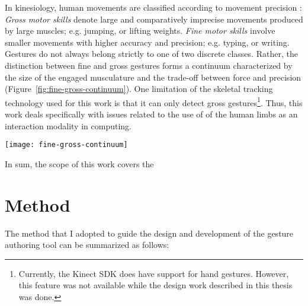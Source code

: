 In kinesiology, human movements are classified according to movement precision \parencite{Haibach:2011}: \emph{Gross motor skills} denote large and comparatively imprecise movements produced by large muscles; e.g. jumping, or lifting weights. \emph{Fine motor skills} involve smaller movements with higher accuracy and precision; e.g. typing, or writing. Gestures do not always belong strictly to one of two discrete classes. Rather, the distinction between fine and gross gestures forms a continuum characterized by the size of the engaged musculature and the trade-off between force and precision \parencite{Edwards:2010} (Figure~\ref{fig:fine-gross-continuum}). One limitation of the skeletal tracking technology used for this work is that it can only detect gross gestures\footnote{Currently, the Kinect SDK does have support for hand gestures. However, this feature was not available while the design work described in this thesis was done.}. Thus, this work deals specifically with issues related to the use of  of the human limbs as an interaction modality in computing.

\begin{SCfigure}[\sidecaptionrelwidth][ht]
\centering
\texttt{[image: fine-gross-continuum]}
\caption{The continuum of \emph{fine} vs. \emph{gross} movements.}
\label{fig:fine-gross-continuum}
\end{SCfigure}

In sum, the scope of this work covers the 

\section{Method}
\label{sec:method}

The method that I adopted to guide the design and development of the gesture authoring tool can be summarized as follows:

